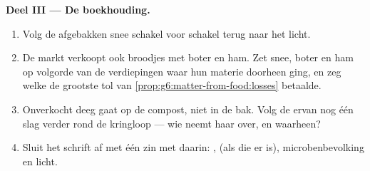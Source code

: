 \begin{problem}
\medskip\noindent\textbf{Deel III --- De boekhouding.}
\begin{enumerate}[resume]
  \item Volg de afgebakken snee schakel voor schakel terug naar het licht.
  \item De markt verkoopt ook broodjes met boter en ham. Zet snee, boter
        en ham op volgorde van de verdiepingen waar hun materie
        doorheen ging, en zeg welke de grootste tol van
        \cref{prop:g6:matter-from-food:losses} betaalde.
  \item Onverkocht deeg gaat op de compost, niet in de bak. Volg de
         ervan nog één slag verder rond de kringloop
        --- wie neemt haar over, en waarheen?
  \item Sluit het schrift af met één zin met daarin: , 
        (als die er is), microbenbevolking en licht.
\end{enumerate}
\end{problem}
